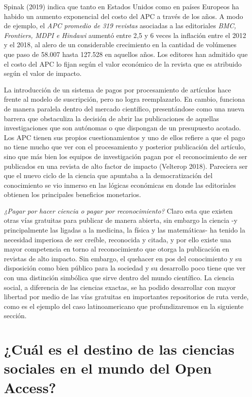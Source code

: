 \documentclass[
  spanish,
  letterpaper,
  DIV=11,
  numbers=noendperiod]{scrreprt}
\begin{document}
Spinak (2019) indica que tanto en Estados Unidos como en países Europeos
ha habido un aumento exponencial del costo del APC a través de los años.
A modo de ejemplo, el \emph{APC promedio de 319 revistas} asociadas a
las editoriales \emph{BMC, Frontiers, MDPI e Hindawi} aumentó entre 2,5
y 6 veces la inflación entre el 2012 y el 2018, al alero de un
considerable crecimiento en la cantidad de volúmenes que paso de 58.007
hasta 127.528 en aquellos años. Los editores han admitido que el costo
del APC lo fijan según el valor económico de la revista que es atribuido
según el valor de impacto.

La introducción de un sistema de pagos por procesamiento de artículos
hace frente al modelo de suscripción, pero no logra reemplazarlo. En
cambio, funciona de manera paralela dentro del mercado científico,
presentándose como una nueva barrera que obstaculiza la decisión de
abrir las publicaciones de aquellas investigaciones que son autónomas o
que dispongan de un presupuesto acotado. Los APC tienen sus propios
cuestionamientos y uno de ellos refiere a que el pago no tiene mucho que
ver con el procesamiento y posterior publicación del artículo, sino que
más bien los equipos de investigación pagan por el reconocimiento de ser
publicados en una revista de alto factor de impacto (Velterop 2018).
Pareciera ser que el nuevo ciclo de la ciencia que apuntaba a la
democratización del conocimiento se vio inmerso en las lógicas
económicas en donde las editoriales obtienen los principales beneficios
monetarios.

\emph{¿Pagar por hacer ciencia o pagar por reconocimiento?} Claro esta
que existen otras vías gratuitas para publicar de manera abierta, sin
embargo la ciencia -y principalmente las ligadas a la medicina, la
física y las matemáticas- ha tenido la necesidad imperiosa de ser
creíble, reconocida y citada, y por ello existe una mayor competencia en
torno al reconocimiento que otorga la publicación en revistas de alto
impacto. Sin embargo, el quehacer en pos del conocimiento y su
disposición como bien público para la sociedad y su desarrollo poco
tiene que ver con una distinción simbólica que sirve dentro del mundo
científico. La ciencia social, a diferencia de las ciencias exactas, se
ha podido desarrollar con mayor libertad por medio de las vías gratuitas
en importantes repositorios de ruta verde, como es el ejemplo del caso
latinoamericano que profundizaremos en la siguiente sección.

\section{¿Cuál es el destino de las ciencias sociales en el mundo del
Open
Access?}\label{cuuxe1l-es-el-destino-de-las-ciencias-sociales-en-el-mundo-del-open-access}
\end{document}

